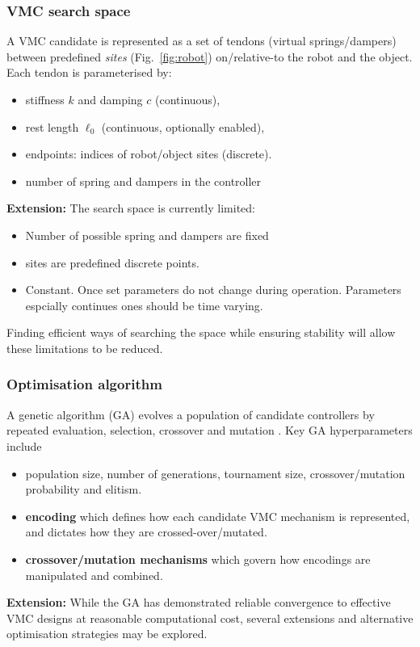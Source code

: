 \documentclass[12pt,a4paper,twocolumn]{article}
\begin{document}
\subsubsection{VMC search space}
A VMC candidate is represented as a set of tendons (virtual springs/dampers) between predefined \emph{sites} (Fig.~\ref{fig:robot})  on/relative-to the robot and the object. Each tendon is parameterised by:
\begin{itemize}
    \item stiffness $k$ and damping $c$ (continuous),
    \item rest length $\ell_0$ (continuous, optionally enabled),
    \item endpoints: indices of robot/object sites (discrete).
    \item number of spring and dampers in the controller
\end{itemize}
\textbf{Extension:} The search space is currently limited:
\begin{itemize}
    \item Number of possible spring and dampers are fixed
    \item sites are predefined discrete points.
    \item Constant. Once set parameters do not change during operation. Parameters espcially continues ones should be time varying.
\end{itemize}
Finding efficient ways of searching the space while ensuring stability will allow these limitations to be reduced.

\subsubsection{Optimisation algorithm}
A genetic algorithm (GA) evolves a population of candidate controllers by repeated evaluation, selection, crossover and mutation \cite{man1996ga}. Key GA hyperparameters include
\begin{itemize}
    \item population size, number of generations, tournament size, crossover/mutation probability and elitism.
    \item \textbf{encoding} which defines how each candidate VMC mechanism is represented, and dictates how they are crossed-over/mutated.
    \item \textbf{crossover/mutation mechanisms} which govern how encodings are manipulated and combined.
\end{itemize}
\textbf{Extension:}
While the GA has demonstrated reliable convergence to effective VMC designs at reasonable computational cost, several extensions and alternative optimisation strategies may be explored.
\end{document}
